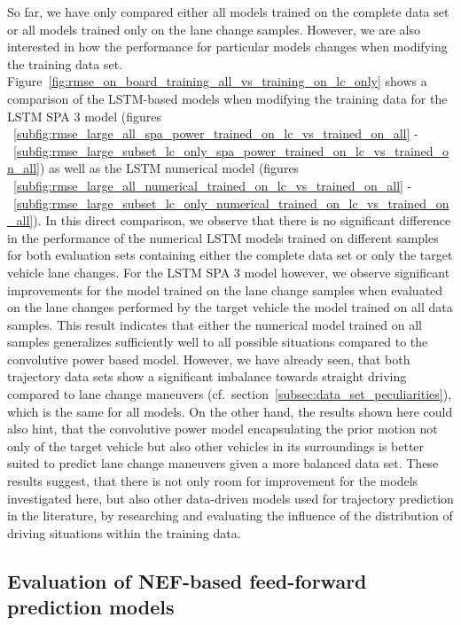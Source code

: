 So far, we have only compared either all models trained on the complete data set or all models trained only on the lane change samples.
However, we are also interested in how the performance for particular models changes when modifying the training data set.
Figure~\ref{fig:rmse_on_board_training_all_vs_training_on_lc_only} shows a comparison of the \ac{LSTM}-based models when modifying the training data for the \ac{LSTM} \acs{SPA} \num{3} model (figures ~\ref{subfig:rmse_large_all_spa_power_trained_on_lc_vs_trained_on_all} - ~\ref{subfig:rmse_large_subset_lc_only_spa_power_trained_on_lc_vs_trained_on_all}) as well as the \acs{LSTM} numerical model (figures
~\ref{subfig:rmse_large_all_numerical_trained_on_lc_vs_trained_on_all} -~\ref{subfig:rmse_large_subset_lc_only_numerical_trained_on_lc_vs_trained_on_all}).
In this direct comparison, we observe that there is no significant difference in the performance of the numerical \ac{LSTM} models trained on different samples for both evaluation sets containing either the complete data set or only the target vehicle lane changes.
For the \ac{LSTM} \acs{SPA} \num{3} model however, we observe significant improvements for the model trained on the lane change samples when evaluated on the lane changes performed by the target vehicle the model trained on all data samples.
This result indicates that either the numerical model trained on all samples generalizes sufficiently well to all possible situations compared to the convolutive power based model.
However, we have already seen, that both trajectory data sets show a significant imbalance towards straight driving compared to lane change maneuvers (cf.\ section~\ref{subsec:data_set_peculiarities}), which is the same for all models.
On the other hand, the results shown here could also hint, that the convolutive power model encapsulating the prior motion not only of the target vehicle but also other vehicles in its surroundings is better suited to predict lane change maneuvers given a more balanced data set.
These results suggest, that there is not only room for improvement for the models investigated here, but also other data-driven models used for trajectory prediction in the literature, by researching and evaluating the influence of the distribution of driving situations within the training data.

\subsection{Evaluation of \acs{NEF}-based feed-forward prediction models}%
\label{subsec:evaluation_of_nef_based_feed_forward_prediction_models}

